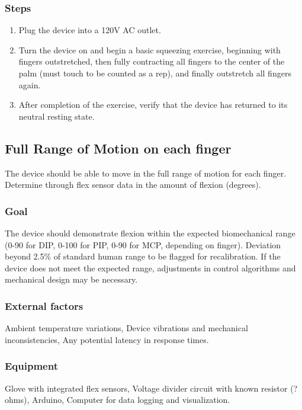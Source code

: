 \documentclass{article}
\begin{document}
\subsubsection{Steps}
\begin{enumerate}
\item Plug the device into a 120V AC outlet.
\item Turn the device on and begin a basic squeezing exercise, beginning with fingers outstretched, then fully contracting all fingers to the center of the palm (must touch to be counted as a rep), and finally outstretch all fingers again.
\item After completion of the exercise, verify that the device has returned to its neutral resting state.
\end{enumerate}

\subsection{Full Range of Motion on each finger}
The device should be able to move in the full range of motion for each finger. Determine through flex sensor data in the amount of flexion (degrees).

\subsubsection{Goal} The device should demonstrate flexion within the expected biomechanical range (0-90 for DIP, 0-100 for PIP, 0-90 for MCP, depending on finger). Deviation beyond 2.5\% of standard human range to be flagged for recalibration. If the device does not meet the expected range, adjustments in control algorithms and mechanical design may be necessary.

\subsubsection{External factors} Ambient temperature variations, Device vibrations and mechanical inconsistencies, Any potential latency in response times.

\subsubsection{Equipment} Glove with integrated flex sensors, Voltage divider circuit with known resistor (? ohms), Arduino, Computer for data logging and visualization.
\end{document}
